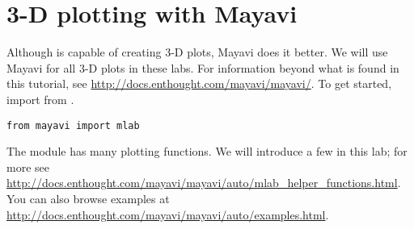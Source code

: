 \section*{3-D plotting with Mayavi}

Although  is capable of creating 3-D plots, Mayavi does it better. 
We will use Mayavi for all 3-D plots in these labs.
For information beyond what is found in this tutorial, see \url{http://docs.enthought.com/mayavi/mayavi/}.
To get started, import  from .
\begin{lstlisting}
from mayavi import mlab
\end{lstlisting}

The module  has many plotting functions.
We will introduce a few in this lab; for more see \url{http://docs.enthought.com/mayavi/mayavi/auto/mlab_helper_functions.html}.
You can also browse examples at \url{http://docs.enthought.com/mayavi/mayavi/auto/examples.html}.

